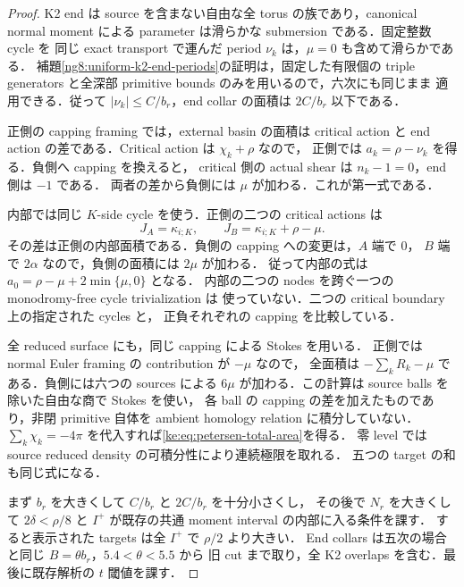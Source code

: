 \begin{proof}
K2 end は source を含まない自由な全 torus の族であり，canonical normal
moment による parameter は滑らかな submersion である．固定整数 cycle を
同じ exact transport で運んだ period $\nu_k$ は，$\mu=0$ も含めて滑らかである．
補題\ref{ng8:uniform-k2-end-periods}の証明は，固定した有限個の triple
generators と全深部 primitive bounds のみを用いるので，六次にも同じまま
適用できる．従って $|\nu_k|\le C/b_r$，end collar の面積は $2C/b_r$ 以下である．

正側の capping framing では，external basin の面積は critical action と
end action の差である．Critical action は $\chi_k+\rho$ なので，
正側では $a_k=\rho-\nu_k$ を得る．負側へ capping を換えると，
critical 側の actual shear は $n_k-1=0$，end 側は $-1$ である．
両者の差から負側には $\mu$ が加わる．これが第一式である．

内部では同じ $K$-side cycle を使う．正側の二つの critical actions は
\[
 J_A=\kappa_{i;K},\qquad
 J_B=\kappa_{i;K}+\rho-\mu .
\]
その差は正側の内部面積である．負側の capping への変更は，$A$ 端で $0$，
$B$ 端で $2\alpha$ なので，負側の面積には $2\mu$ が加わる．
従って内部の式は $a_0=\rho-\mu+2\min\{\mu,0\}$ となる．
内部の二つの nodes を跨ぐ一つの monodromy-free cycle trivialization は
使っていない．二つの critical boundary 上の指定された cycles と，
正負それぞれの capping を比較している．

全 reduced surface にも，同じ capping による Stokes を用いる．
正側では normal Euler framing の contribution が $-\mu$ なので，
全面積は $-\sum_kR_k-\mu$ である．負側には六つの sources による
$6\mu$ が加わる．この計算は source balls を除いた自由な商で Stokes を使い，
各 ball の capping の差を加えたものであり，非閉 primitive 自体を
ambient homology relation に積分していない．
$\sum_k\chi_k=-4\pi$ を代入すれば\eqref{ke:eq:petersen-total-area}を得る．
零 level では source reduced density の可積分性により連続極限を取れる．
五つの target の和も同じ式になる．

まず $b_r$ を大きくして $C/b_r$ と $2C/b_r$ を十分小さくし，
その後で $N_r$ を大きくして $2\delta<\rho/8$ と
$I^+$ が既存の共通 moment interval の内部に入る条件を課す．
すると表示された targets は全 $I^+$ で $\rho/2$ より大きい．
End collars は五次の場合と同じ $B=\theta b_r$，$5.4<\theta<5.5$ から
旧 cut まで取り，全 K2 overlaps を含む．最後に既存解析の $t$ 閾値を課す．
\end{proof}

